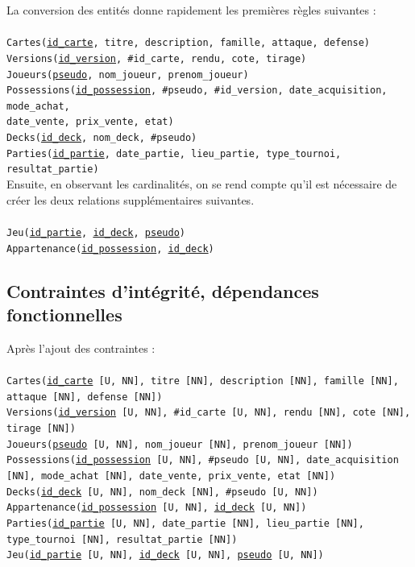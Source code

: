 \documentclass[a4paper,10.5pt]{article}
\begin{document}
La conversion des entités donne rapidement les premières règles suivantes :\\
\\
\texttt{Cartes(\underline{id\_carte}, titre, description, famille, attaque, defense)} \\
\texttt{Versions(\underline{id\_version}, \#id\_carte, rendu, cote, tirage)} \\
\texttt{Joueurs(\underline{pseudo}, nom\_joueur, prenom\_joueur)} \\
\texttt{Possessions(\underline{id\_possession}, \#pseudo, \#id\_version, date\_acquisition, mode\_achat,\\ date\_vente, prix\_vente, etat)} \\
\texttt{Decks(\underline{id\_deck}, nom\_deck, \#pseudo)} \\
\texttt{Parties(\underline{id\_partie}, date\_partie, lieu\_partie, type\_tournoi, resultat\_partie)} \\

Ensuite, en observant les cardinalités, on se rend compte qu'il est nécessaire de créer les deux relations supplémentaires suivantes. \\
\\
\texttt{Jeu(\underline{id\_partie}, \underline{id\_deck}, \underline{pseudo})} \\
\texttt{Appartenance(\underline{id\_possession}, \underline{id\_deck})} \\

\subsection{Contraintes d'intégrité, dépendances fonctionnelles}
Après l'ajout des contraintes : \\
\\
\texttt{Cartes(\underline{id\_carte} [U, NN], titre [NN], description [NN], famille [NN], attaque [NN], defense [NN])} \\
\texttt{Versions(\underline{id\_version} [U, NN], \#id\_carte [U, NN], rendu [NN], cote [NN], tirage [NN])} \\
\texttt{Joueurs(\underline{pseudo} [U, NN], nom\_joueur [NN], prenom\_joueur [NN])} \\
\texttt{Possessions(\underline{id\_possession} [U, NN], \#pseudo [U, NN], date\_acquisition [NN], mode\_achat [NN], date\_vente, prix\_vente, etat [NN])} \\
\texttt{Decks(\underline{id\_deck} [U, NN], nom\_deck [NN], \#pseudo [U, NN])} \\
\texttt{Appartenance(\underline{id\_possession} [U, NN], \underline{id\_deck} [U, NN])} \\
\texttt{Parties(\underline{id\_partie} [U, NN], date\_partie [NN], lieu\_partie [NN], type\_tournoi [NN], resultat\_partie [NN])} \\
\texttt{Jeu(\underline{id\_partie} [U, NN], \underline{id\_deck} [U, NN], \underline{pseudo} [U, NN])} \\
\end{document}
